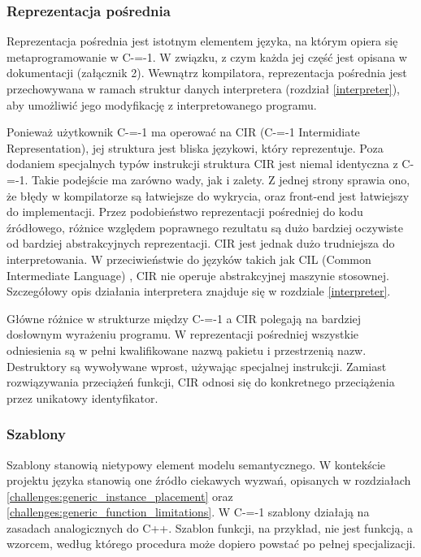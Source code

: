 \subsubsection{Reprezentacja pośrednia}
\label{implementation:intermidiate_representation}
Reprezentacja pośrednia jest istotnym elementem języka, na którym opiera się metaprogramowanie w C-=-1.
W związku, z czym każda jej część jest opisana w dokumentacji (załącznik 2).
Wewnątrz kompilatora, reprezentacja pośrednia jest przechowywana w ramach struktur danych interpretera (rozdział \ref{interpreter}), aby umożliwić jego modyfikację z interpretowanego programu.

Ponieważ użytkownik C-=-1 ma operować na CIR (C-=-1 Intermidiate Representation), jej struktura jest bliska językowi, który reprezentuje. 
Poza dodaniem specjalnych typów instrukcji struktura CIR jest niemal identyczna z C-=-1.
Takie podejście ma zarówno wady, jak i zalety. 
Z jednej strony sprawia ono, że błędy w kompilatorze są łatwiejsze do wykrycia, oraz front-end jest łatwiejszy do implementacji.
Przez podobieństwo reprezentacji pośredniej do kodu źródłowego, różnice względem poprawnego rezultatu są dużo bardziej oczywiste od bardziej abstrakcyjnych reprezentacji.
CIR jest jednak dużo trudniejsza do interpretowania.
W przeciwieństwie do języków takich jak CIL (Common Intermediate Language) \cite{ecma:cli}, CIR nie operuje abstrakcyjnej maszynie stosownej.
Szczegółowy opis działania interpretera znajduje się w rozdziale \ref{interpreter}.

Główne różnice w strukturze między C-=-1 a CIR polegają na bardziej dosłownym wyrażeniu programu. W reprezentacji pośredniej wszystkie odniesienia są w pełni kwalifikowane nazwą pakietu i przestrzenią nazw. Destruktory są wywoływane wprost, używając specjalnej instrukcji. Zamiast rozwiązywania przeciążeń funkcji, CIR odnosi się do konkretnego przeciążenia przez unikatowy identyfikator.

\subsubsection{Szablony}
\label{implementation:generics}
Szablony stanowią nietypowy element modelu semantycznego.
W kontekście projektu języka stanowią one źródło ciekawych wyzwań, opisanych w rozdziałach \ref{challenges:generic_instance_placement} oraz \ref{challenges:generic_function_limitations}.
W C-=-1 szablony działają na zasadach analogicznych do C++.
Szablon funkcji, na przykład, nie jest funkcją, a wzorcem, według którego procedura może dopiero powstać po pełnej specjalizacji.

